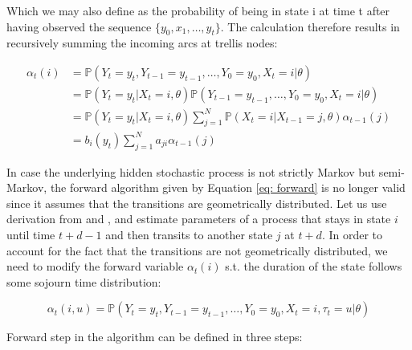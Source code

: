 Which we may also define as the probability of being in state i at time t after having observed the sequence $\{y_0,x_1,\ldots,y_t\}$. 
The calculation therefore results in recursively summing the incoming arcs at trellis nodes:

\begin{align} \label{eq: forward}
    \alpha_t(i) &= \mathbb{P}(Y_t = y_t, Y_{t-1} = y_{t-1},\ldots, Y_0 = y_0 , X_t = i| \theta) \\ \nonumber
                &= \mathbb{P}(Y_t = y_t | X_t = i, \theta) \mathbb{P}(Y_{t-1} = y_{t-1},\ldots, Y_0 = y_0 , X_t = i| \theta)  \\ \nonumber
                &= \mathbb{P}(Y_t = y_t | X_t = i, \theta) \sum\limits_{j = 1}^N \mathbb{P}(X_t = i| X_{t-1}=j,\theta) \alpha_{t-1}(j)\\ \nonumber
                &= b_i(y_t) \sum\limits_{j=1}^N a_{ji} \alpha_{t-1}(j)
\end{align}

In case the underlying hidden stochastic process is not strictly Markov but semi-Markov, the forward algorithm given by Equation \ref{eq: forward} is no longer valid since it assumes 
that the transitions are geometrically distributed. Let us use derivation from \citep{Yu2013} and \citep{Narimatsu2017}, and estimate parameters of a process that stays in state $i$ until time $t+d-1$ and then transits to another state $j$ at $t+d$. 
In order to account for the fact that the transitions are not geometrically distributed, we need to modify the forward variable $\alpha_t(i)$
s.t. the duration of the state follows some sojourn time distribution:

\begin{equation}
    \alpha_t(i,u) = \mathbb{P}(Y_t = y_t, Y_{t-1} = y_{t-1},\ldots, Y_0 = y_0 , X_t = i, \tau_t = u| \theta)
\end{equation}

Forward step in the algorithm can be defined in three steps:

